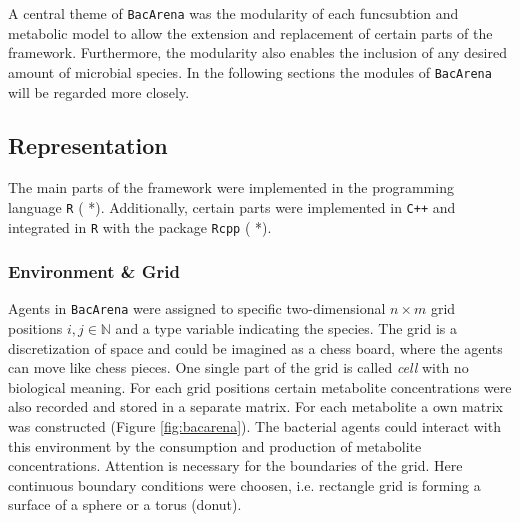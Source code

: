A central theme of \texttt{BacArena} was the modularity of each funcsubtion and metabolic model to allow the extension and replacement of certain parts of the framework. Furthermore, the modularity also enables the inclusion of any desired amount of microbial species. In the following sections the modules of \texttt{BacArena} will be regarded more closely. 

\subsection{Representation}
The main parts of the framework were implemented in the programming language \texttt{R} ( *). Additionally, certain parts were implemented in \texttt{C++} and integrated in \texttt{R} with the package \texttt{Rcpp} ( *).

\subsubsection{Environment \& Grid}
Agents in \texttt{BacArena} were assigned to specific two-dimensional $n \times m$ grid positions $i, j \in \mathbb{N}$ and a type variable indicating the species. The grid is a discretization of space and could be imagined as a chess board, where the agents can move like chess pieces. 
One single part of the grid is called \textit{cell} with no biological meaning.
For each grid positions certain metabolite concentrations were also recorded and stored in a separate matrix. For each metabolite a own matrix was constructed (Figure \hyperref[fig:bacarena]{\ref{fig:bacarena}}). The bacterial agents could interact with this environment by the consumption and production of metabolite concentrations.
Attention is necessary for the boundaries of the grid.
Here continuous boundary conditions were choosen, i.e. rectangle grid is forming a surface of a sphere or a torus (donut).


